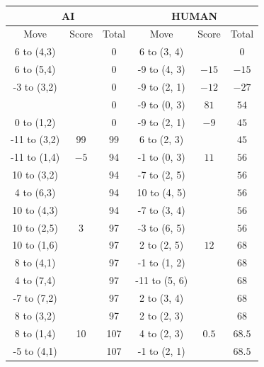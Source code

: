 \begin{appendices}
\begin{table}[H]
    \centering
    \begin{tabular}{cccccc}
        \hline
        \multicolumn{3}{c}{AI}        & \multicolumn{3}{c}{HUMAN}     \\ \hline
        Move         & Score & Total & Move          & Score & Total \\ \hline
          6 to (4,3) &      &  0    &   6 to (3, 4) &      &  0    \\ \hline
          6 to (5,4) &      &  0    &   -9 to (4, 3) &  $-15$    &  $-15$    \\ \hline
          -3 to (3,2) &      &  0    &   -9 to (2, 1) &  $-12$    &  $-27$    \\ \hline
                      &      &  0    &   -9 to (0, 3) &  $81$    &  $54$    \\ \hline
          0 to (1,2) &      &  0    &   -9 to (2, 1) &  $-9$    &  $45$    \\ \hline
          -11 to (3,2) &  99  &  99    &   6 to (2, 3) &      &  $45$    \\ \hline
          -11 to (1,4) &  $-5$   &  94    &   -1 to (0, 3) &  $11$    &  $56$    \\ \hline
          10 to (3,2) &     &  94    &   -7 to (2, 5) &      &  $56$    \\ \hline
          4 to (6,3) &      &  94    &   10 to (4, 5) &      &  $56$    \\ \hline
          10 to (4,3) &      &  94    &   -7 to (3, 4) &      &  $56$    \\ \hline
          10 to (2,5) &  3    &  97    &   -3 to (6, 5) &      &  $56$    \\ \hline
          10 to (1,6) &      &  97    &   2 to (2, 5) &  $12$    &  $68$    \\ \hline
          8 to (4,1) &      &  97    &   -1 to (1, 2) &      &  $68$    \\ \hline
          4 to (7,4) &      &  97    &   -11 to (5, 6) &      &  $68$    \\ \hline
          -7 to (7,2) &      &  97    &   2 to (3, 4) &      &  $68$    \\ \hline
          8 to (3,2) &      &  97    &   2 to (2, 3) &      &  $68$    \\ \hline
          8 to (1,4) &  10    &  107    &   4 to (2, 3) &  $0.5$    &  $68.5$    \\ \hline
          -5 to (4,1) &      &  107    &   -1 to (2, 1) &      &  $68.5$    \\ \hline

\end{tabular}
\end{table}
\end{appendices}
